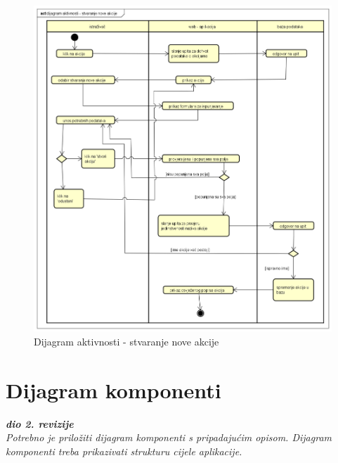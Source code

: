 		\begin{figure}[H]
			\includegraphics[scale=0.5]{slike/dijagram aktivnosti - stvaranje nove akcije.png}
			\centering
			\caption{Dijagram aktivnosti - stvaranje nove akcije}
			\label{fig:dijagram aktivnosti - stvaranje nove akcije}
		\end{figure}

			\eject
		\section{Dijagram komponenti}
		
			\textbf{\textit{dio 2. revizije}}\\
		
			 \textit{Potrebno je priložiti dijagram komponenti s pripadajućim opisom. Dijagram komponenti treba prikazivati strukturu cijele aplikacije.}
